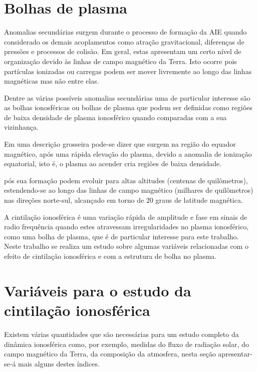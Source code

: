 \section{Bolhas de plasma}

Anomalias secundárias surgem durante o processo de formação da AIE quando considerado os demais acoplamentos como atração gravitacional, diferenças de pressões e processos de colisão. Em geral, estas apresentam um certo nível de organização devido às linhas de campo magnético da Terra. Isto ocorre pois partículas ionizadas ou carregas podem ser mover livremente ao longo das linhas magnéticas mas não entre elas.

Dentre as várias possíveis anomalias secundárias uma de particular interesse são as bolhas ionosféricas ou bolhas de plasma que podem ser definidas como regiões de baixa densidade de plasma ionosférico quando comparadas com a sua vizinhança. 

Em uma descrição grosseira pode-se dizer que surgem na região do equador magnético, após uma rápida elevação do plasma, devido a anomalia de ionização equatorial, isto é, o plasma ao acender cria regiões de baixa densidade.

pós sua formação podem evoluir para altas altitudes (centenas de quilômetros), estendendo-se ao longo das linhas de campo magnético (milhares de quilômetros) nas direções norte-sul, alcançado em torno de 20 graus de latitude magnética.


A cintilação ionosférica é uma variação rápida de amplitude e fase em sinais de radio frequência quando estes atravessam irregularidades no plasma ionosférico, como uma bolha de plasma, que é de particular interesse para este trabalho. Neste trabalho se realiza um estudo sobre algumas variáveis relacionadas com o efeito de cintilação ionosférica e com a estrutura de bolha no plasma.

\section{Variáveis para o estudo da cintilação ionosférica}

Existem várias quantidades que são necessárias para um estudo completo da dinâmica ionosférica como, por exemplo, medidas do fluxo de radiação solar, do campo magnético da Terra, da composição da atmosfera, nesta seção apresentar-se-á mais alguns destes índices.

